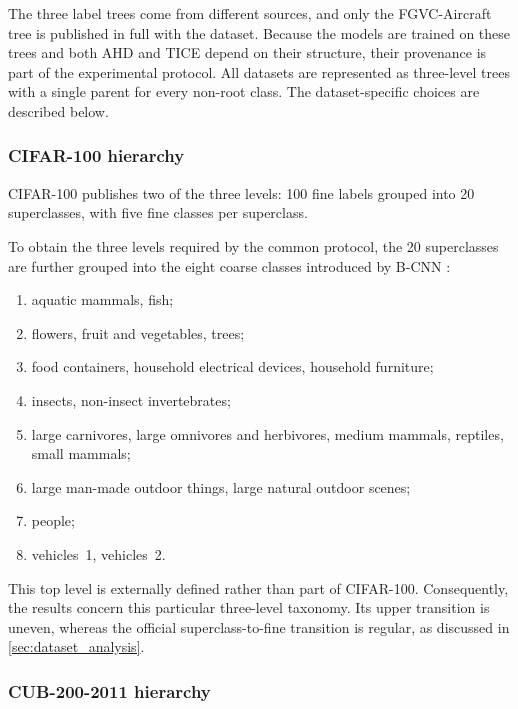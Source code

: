 The three label trees come from different sources, and only the FGVC-Aircraft
tree is published in full with the dataset. Because the models are trained on
these trees and both AHD and TICE depend on their structure, their provenance is
part of the experimental protocol. All datasets are represented as three-level
trees with a single parent for every non-root class. The dataset-specific choices
are described below.

\subsubsection{CIFAR-100 hierarchy}

CIFAR-100 \cite{krizhevsky2009learning} publishes two of the three levels: 100
fine labels grouped into 20 superclasses, with five fine classes per superclass.

To obtain the three levels required by the common protocol, the 20 superclasses
are further grouped into the eight coarse classes introduced by B-CNN
\cite{zhu2017bcnn}:

\begin{enumerate}[label=(\arabic*), itemsep=0pt, topsep=3pt]
  \item aquatic mammals, fish;
  \item flowers, fruit and vegetables, trees;
  \item food containers, household electrical devices, household furniture;
  \item insects, non-insect invertebrates;
  \item large carnivores, large omnivores and herbivores, medium mammals, reptiles, small mammals;
  \item large man-made outdoor things, large natural outdoor scenes;
  \item people;
  \item vehicles~1, vehicles~2.
\end{enumerate}

This top level is externally defined rather than part of CIFAR-100. Consequently,
the results concern this particular three-level taxonomy. Its upper transition is
uneven, whereas the official superclass-to-fine transition is regular, as
discussed in \cref{sec:dataset_analysis}.

\subsubsection{CUB-200-2011 hierarchy}

